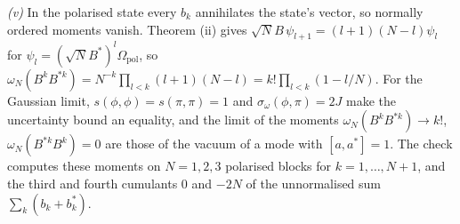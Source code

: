 \emph{(v)} In the polarised state every $b_{k}$ annihilates the state's vector, so normally ordered moments vanish. Theorem (ii) gives $\sqrt N B\,\psi_{l+1} = (l + 1)(N - l)\psi_{l}$ for $\psi_{l} = (\sqrt N B^{*})^{l}\Omega_{\mathrm{pol}}$, so $\omega_{N}(B^{k}B^{*k}) = N^{-k}\prod_{l < k}(l + 1)(N - l) = k!\prod_{l < k}(1 - l/N)$. For the Gaussian limit, $s(\phi, \phi) = s(\pi, \pi) = 1$ and $\sigma_{\omega}(\phi, \pi) = 2J$ make the uncertainty bound an equality, and the limit of the moments $\omega_{N}(B^{k}B^{*k}) \to k!$, $\omega_{N}(B^{*k}B^{k}) = 0$ are those of the vacuum of a mode with $[a, a^{*}] = 1$. The check computes these moments on $N = 1, 2, 3$ polarised blocks for $k = 1, \dots, N + 1$, and the third and fourth cumulants $0$ and $-2N$ of the unnormalised sum $\sum_{k}(b_{k} + b_{k}^{*})$.
